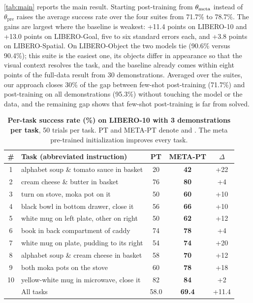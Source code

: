 \cref{tab:main} reports the main result.
Starting post-training from $\theta_{\mathrm{meta}}$ instead of $\theta_{\mathrm{pre}}$ raises the average success rate over the four suites from 71.7\% to 78.7\%.
The gains are largest where the baseline is weakest: +11.4 points on LIBERO-10 and +13.0 points on LIBERO-Goal, five to six standard errors each, and +3.8 points on LIBERO-Spatial.
On LIBERO-Object the two models tie (90.6\% versus 90.4\%); this suite is the easiest one, its objects differ in appearance so that the visual context resolves the task, and the baseline already comes within eight points of the full-data result from 30 demonstrations.
Averaged over the suites, our approach closes 30\% of the gap between few-shot post-training (71.7\%) and post-training on all demonstrations (95.3\%) without touching the model or the data, and the remaining gap shows that few-shot post-training is far from solved.

\begin{table}[t]
  \centering
  \footnotesize
  \setlength{\tabcolsep}{3pt}
  \begin{tabular}{clccc}
    \toprule
    \# & Task (abbreviated instruction) & PT & META-PT & $\Delta$ \\
    \midrule
    1 & alphabet soup \& tomato sauce in basket   & 20 & \textbf{42} & +22 \\
    2 & cream cheese \& butter in basket          & 76 & \textbf{80} & +4 \\
    3 & turn on stove, moka pot on it             & 50 & \textbf{60} & +10 \\
    4 & black bowl in bottom drawer, close it     & 56 & \textbf{66} & +10 \\
    5 & white mug on left plate, other on right & 50 & \textbf{62} & +12 \\
    6 & book in back compartment of caddy         & 74 & \textbf{78} & +4 \\
    7 & white mug on plate, pudding to its right  & 54 & \textbf{74} & +20 \\
    8 & alphabet soup \& cream cheese in basket   & 58 & \textbf{70} & +12 \\
    9 & both moka pots on the stove               & 60 & \textbf{78} & +18 \\
    10 & yellow-white mug in microwave, close it  & 82 & \textbf{84} & +2 \\
    \midrule
    & All tasks                                   & 58.0 & \textbf{69.4} & +11.4 \\
    \bottomrule
  \end{tabular}
  \caption{\textbf{Per-task success rate (\%) on LIBERO-10 with 3 demonstrations per task}, 50 trials per task.
  PT and META-PT denote \basept and \metapt.
  The meta pre-trained initialization improves every task.}
  \label{tab:pertask}
\end{table}

